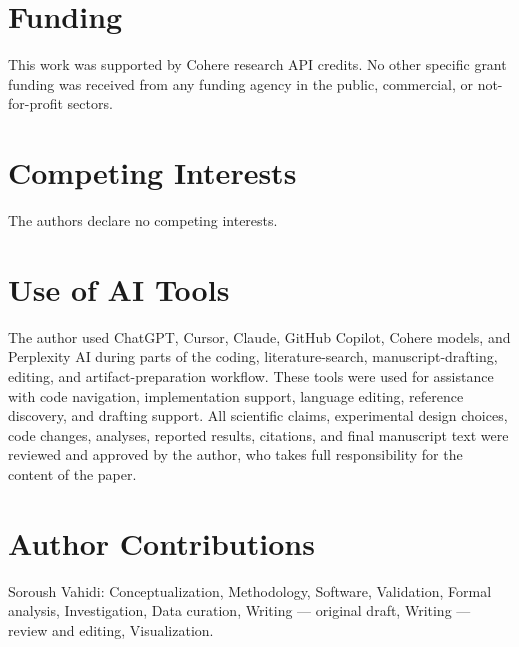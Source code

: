\section*{Funding}
This work was supported by Cohere research API credits. No other specific grant
funding was received from any funding agency in the public, commercial, or
not-for-profit sectors.

\section*{Competing Interests}
The authors declare no competing interests.

\section*{Use of AI Tools}
The author used ChatGPT, Cursor, Claude, GitHub Copilot, Cohere models, and Perplexity AI during parts of the coding, literature-search, manuscript-drafting, editing, and artifact-preparation workflow. These tools were used for assistance with code navigation, implementation support, language editing, reference discovery, and drafting support. All scientific claims, experimental design choices, code changes, analyses, reported results, citations, and final manuscript text were reviewed and approved by the author, who takes full responsibility for the content of the paper.

\section*{Author Contributions}
Soroush Vahidi: Conceptualization, Methodology, Software, Validation, Formal analysis,
Investigation, Data curation, Writing --- original draft, Writing --- review and editing,
Visualization.
